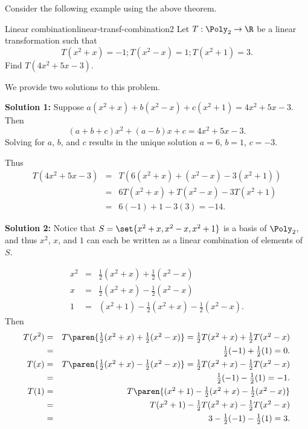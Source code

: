 Consider the following example using the above theorem.

\begin{example}{Linear combination}{linear-transf-combination2}
Let $T:\Poly_2 \to \R$ be a linear transformation such that
\[ T(x^2+x)=-1; T(x^2-x)=1; T(x^2+1)=3.\]
Find $T(4x^2+5x-3)$.
\end{example}

\begin{solution}
We provide two solutions to this problem.

\textbf{Solution 1:}
Suppose
$a(x^2+x) + b(x^2-x) + c(x^2+1) = 4x^2+5x-3$.
Then
\[ (a+b+c)x^2 + (a-b)x + c = 4x^2+5x-3.\]
Solving for $a$, $b$, and $c$ results in the unique solution
$a=6$, $b=1$, $c=-3$.

Thus
\begin{eqnarray*}
T(4x^2+5x-3) & = & T(6(x^2+x) + (x^2-x) -3(x^2+1)) \\
& = & 6T(x^2+x) + T(x^2-x) -3T(x^2+1) \\
& = & 6(-1) + 1 -3(3) = -14.
\end{eqnarray*}

\textbf{Solution 2:}
Notice that
$S=\set{x^2+x, x^2-x, x^2+1}$ is a basis of $\Poly_2$, and
thus $x^2$, $x$, and $1$ can each be written as a linear
combination of elements of $S$.

\begin{eqnarray*}
x^2 & = & \textstyle \frac{1}{2}(x^2+x) + \frac{1}{2}(x^2-x) \\
x & = & \textstyle \frac{1}{2}(x^2+x) - \frac{1}{2}(x^2-x) \\
1 & = & (x^2+1)-\textstyle \frac{1}{2}(x^2+x) - \frac{1}{2}(x^2-x).
\end{eqnarray*}
Then
\begin{eqnarray*}
T(x^2) & = & \textstyle T\paren{\frac{1}{2}(x^2+x) + \frac{1}{2}(x^2-x)}
=\frac{1}{2}T(x^2+x) + \frac{1}{2}T(x^2-x)\\
& = & \textstyle \frac{1}{2}(-1) + \frac{1}{2}(1) = 0.  \\
T(x) & = & \textstyle T\paren{\frac{1}{2}(x^2+x) - \frac{1}{2}(x^2-x)}
= \frac{1}{2}T(x^2+x) - \frac{1}{2}T(x^2-x) \\
& = & \textstyle \frac{1}{2}(-1) - \frac{1}{2}(1) = -1.\\
T(1) & = & \textstyle T\paren{(x^2+1)-\frac{1}{2}(x^2+x) -
\frac{1}{2}(x^2-x)}\\
& = & \textstyle T(x^2+1)-\frac{1}{2}T(x^2+x) - \frac{1}{2}T(x^2-x) \\
& = & \textstyle 3-\frac{1}{2}(-1) - \frac{1}{2}(1) = 3.
\end{eqnarray*}


\end{solution}
